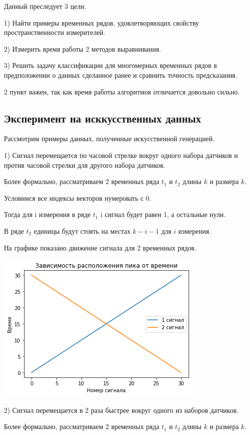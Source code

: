 \documentclass[12pt, twoside]{article}
\begin{document}
Данный преследует 3 цели.

1) Найти примеры временных рядов, удовлетворяющих свойству пространственности измерителей.

2) Измерить время работы 2 методов выравнивания.

3) Решить задачу классификации для многомерных временных рядов в предположении о данных сделанное ранее и сравнить точность предсказания.

2 пункт важен, так как время работы алгоритмов отличается довольно сильно.

\subsection{Эксперимент на исккусственных данных}


Рассмотрим примеры данных, полученные искусственной генерацией.

1) Сигнал перемещается по часовой стрелке вокруг одного набора датчиков и против часовой стрелки для другого набора датчиков.

Более формально, рассматриваем 2 временных ряда $t_1$  и $t_2$ длины $k$ и размера $k$.

Условимся все индексы векторов нумеровать с 0.

Тогда для i измерения в ряде $t_1$ i сигнал будет равен 1, а остальные нули.

В ряде $t_2$ единицы будут стоять на местах $k - i - 1$ для $i$ измерения.


На графике показано движение сигнала для 2 временных рядов.

\includegraphics{rev_signal}

2) Сигнал перемещается в 2 раза быстрее вокруг одного из наборов датчиков.

Более формально, рассматриваем 2 временных ряда $t_1$  и $t_2$ длины $k$ и размера $k$.
\end{document}
